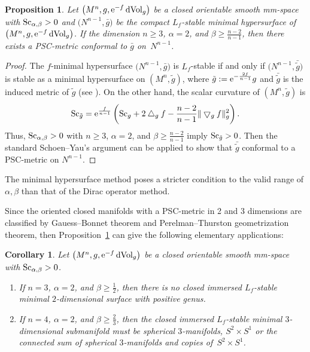 \documentclass[pdftex]{sigma}
\newtheorem{Corollary}[Theorem]{Corollary}
\newtheorem{Proposition}[Theorem]{Proposition}
\begin{document}
\begin{Proposition}\label{hypersuface}
Let $\big(M^n, g, {\rm e}^{-f}\,{\rm dVol}_g\big)$ be a closed orientable smooth mm-space with \linebreak \mbox{${\rm Sc}_{\alpha, \beta} > 0$} and $\big(N^{n-1},\bar{g}\big)$ be the compact $L_f$-stable minimal hypersurface of $\big(M^n, g, {\rm e}^{-f}\,{\rm dVol}_g\big)$. If the dimension $n\geq 3$, $\alpha=2$, and $\beta \geq \frac{n-2}{n-1}$, then there exists a PSC-metric conformal to $\bar{g}$ on~$N^{n-1}$.
\end{Proposition}

\begin{proof}The $f$-minimal hypersurface $\big(N^{n-1}, \bar{g}\big)$ is $L_f$-stable if and only if $\big(N^{n-1}, \bar{\tilde{g}}\big)$ is stable as a minimal hypersurface on $(M^n, \tilde{g})$, where $\tilde{g}:={\rm e}^{-\frac{2f}{n-1}}g$ and $ \bar{\tilde{g}}$ is the induced metric of $\tilde{g}$ (see \cite[Appendix]{MR3324919}). On the other hand, the scalar curvature of $(M^n, \tilde{g})$ is
\begin{gather*}
{\rm Sc}_{\tilde{g}}= {\rm e}^{\frac{f}{n-1}}\left({\rm Sc}_g +2\bigtriangleup_gf-\frac{n-2}{n-1}\|\bigtriangledown_gf\|^2_g\right).
\end{gather*}
Thus, ${\rm Sc}_{\alpha, \beta} > 0$ with $n\geq 3$, $\alpha=2$, and $\beta \geq \frac{n-2}{n-1}$ imply ${\rm Sc}_{\tilde{g}}>0$. Then the standard Schoen--Yau's argument can be applied to show that $\bar{\tilde{g}}$ conformal to a PSC-metric on $N^{n-1}$.
\end{proof}

\begin{Remark}The minimal hypersurface method poses a stricter condition to the valid range of $\alpha, \beta$ than that of the Dirac operator method.
\end{Remark}

Since the oriented closed manifolds with a PSC-metric in 2 and 3 dimensions are classified by Gauess--Bonnet theorem and Perelman--Thurston geometrization theorem, then Proposition~\ref{hypersuface} can give the following elementary applications:

\begin{Corollary}\label{minisurface}
Let $\big(M^n, g, {\rm e}^{-f}\,{\rm dVol}_g\big)$ be a closed orientable smooth mm-space with ${\rm Sc}_{\alpha, \beta} > 0$.
\begin{enumerate}\itemsep=0pt
\item[$1.$] If $n=3$, $\alpha=2$, and $\beta \geq \frac{1}{2}$, then there is no closed immersed $L_f$-stable minimal $2$-di\-men\-sional surface with positive genus.
\item[$2.$] If $n=4$, $\alpha=2$, and $\beta \geq \frac{2}{3}$, then the closed immersed $L_f$-stable minimal $3$-dimensional submanifold must be spherical $3$-manifolds, $S^2\times S^1$ or the connected sum of spherical $3$-manifolds and copies of~$S^2\times S^1$.
\end{enumerate}
\end{Corollary}
\end{document}
